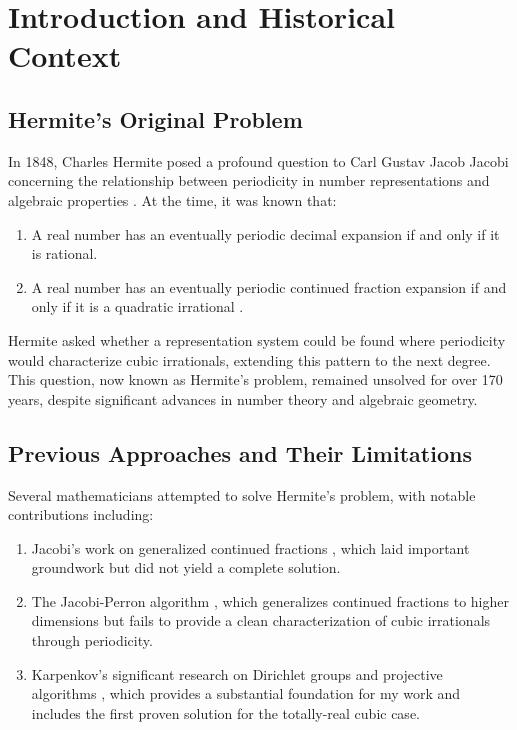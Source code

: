 \section{Introduction and Historical Context}

\subsection{Hermite's Original Problem}

In 1848, Charles Hermite posed a profound question to Carl Gustav Jacob Jacobi concerning the relationship between periodicity in number representations and algebraic properties \cite{Hermite1848}. At the time, it was known that:
\begin{enumerate}
    \item A real number has an eventually periodic decimal expansion if and only if it is rational.
    \item A real number has an eventually periodic continued fraction expansion if and only if it is a quadratic irrational \cite{Lagrange1770}.
\end{enumerate}

Hermite asked whether a representation system could be found where periodicity would characterize cubic irrationals, extending this pattern to the next degree. This question, now known as Hermite's problem, remained unsolved for over 170 years, despite significant advances in number theory and algebraic geometry.

\subsection{Previous Approaches and Their Limitations}

Several mathematicians attempted to solve Hermite's problem, with notable contributions including:

\begin{enumerate}
    \item Jacobi's work on generalized continued fractions \cite{Jacobi1868}, which laid important groundwork but did not yield a complete solution.
    
    \item The Jacobi-Perron algorithm \cite{Perron1907}, which generalizes continued fractions to higher dimensions but fails to provide a clean characterization of cubic irrationals through periodicity.
    
    \item Karpenkov's significant research on Dirichlet groups and projective algorithms \cite{Karpenkov2022}, which provides a substantial foundation for my work and includes the first proven solution for the totally-real cubic case.
\end{enumerate}

